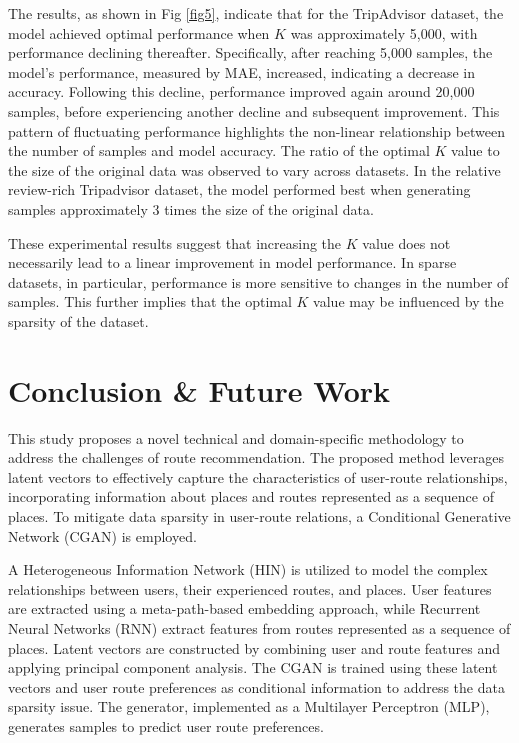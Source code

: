 \documentclass[]{article}
\begin{document}
The results, as shown in Fig \ref{fig5}, indicate that for the TripAdvisor dataset, the model achieved optimal performance when $K$ was approximately 5,000, with performance declining thereafter. Specifically, after reaching 5,000 samples, the model's performance, measured by MAE, increased, indicating a decrease in accuracy. Following this decline, performance improved again around 20,000 samples, before experiencing another decline and subsequent improvement. This pattern of fluctuating performance highlights the non-linear relationship between the number of samples and model accuracy. The ratio of the optimal $K$ value to the size of the original data was observed to vary across datasets. In the relative review-rich Tripadvisor dataset, the model performed best when generating samples approximately 3 times the size of the original data.

These experimental results suggest that increasing the $K$ value does not necessarily lead to a linear improvement in model performance. In sparse datasets, in particular, performance is more sensitive to changes in the number of samples. This further implies that the optimal $K$ value may be influenced by the sparsity of the dataset.

\section{Conclusion \& Future Work}
\label{sec:Con}

This study proposes a novel technical and domain-specific methodology to address the challenges of route recommendation. The proposed method leverages latent vectors to effectively capture the characteristics of user-route relationships, incorporating information about places and routes represented as a sequence of places. To mitigate data sparsity in user-route relations, a Conditional Generative Network (CGAN) is employed.

A Heterogeneous Information Network (HIN) is utilized to model the complex relationships between users, their experienced routes, and places. User features are extracted using a meta-path-based embedding approach, while Recurrent Neural Networks (RNN) extract features from routes represented as a sequence of places. Latent vectors are constructed by combining user and route features and applying principal component analysis. The CGAN is trained using these latent vectors and user route preferences as conditional information to address the data sparsity issue. The generator, implemented as a Multilayer Perceptron (MLP), generates samples to predict user route preferences.
\end{document}
